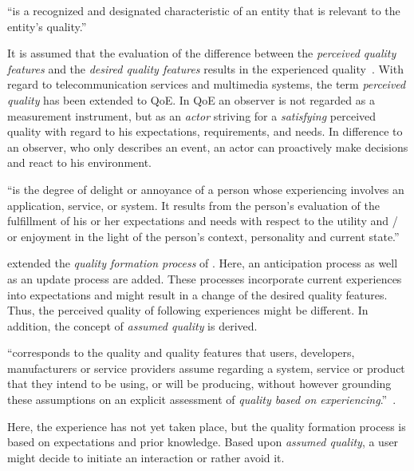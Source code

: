 \begin{definition}
``is a recognized and designated characteristic of an entity that is relevant to the entity's quality.''~\citep[][p.\,17]{jekosch_voice_2005}
\end{definition}

It is assumed that the evaluation of the difference between the \emph{perceived quality features} and the \emph{desired quality features} results in the experienced quality~\citep[p.\,23]{raake_quality_2014}.
With regard to telecommunication services and multimedia systems, the term \emph{perceived quality} has been extended to \acf{QoE}.
In \ac{QoE} an observer is not regarded as a measurement instrument, but as an \emph{actor} striving for a \emph{satisfying} perceived quality with regard to his expectations, requirements,  and needs.\label{actor} 
In difference to an observer, who only describes an event, an actor can proactively make decisions and react to his environment.  

\begin{definition}
``is the degree of delight or annoyance of a person whose experiencing involves an application, service, or system.
It results from the person’s evaluation of the fulfillment of his or her expectations and needs with respect to the utility and / or enjoyment in the light of the person’s context, personality and current state.''~\citep[][p.\,19]{raake_quality_2014}
\end{definition}

\citet{raake_quality_2014} extended the \emph{quality formation process} of \citet{jekosch_voice_2005}.
Here, an anticipation process as well as an update process are added.
These processes incorporate current experiences into expectations and might result in a change of the desired quality features.
Thus, the perceived quality of following experiences might be different.
In addition, the concept of \emph{assumed quality} is derived.
\begin{definition}\label{def:assumedquality}
``corresponds to the quality and quality features that users, developers, manufacturers or service providers assume regarding a system, service or product that they intend to be using, or will be producing, without however grounding these assumptions on an explicit assessment of \textit{quality based on experiencing}.''~\citep[][p.\,17]{raake_quality_2014}.
\end{definition}
Here, the experience has not yet taken place, but the quality formation process is based on expectations and prior knowledge.
Based upon \emph{assumed quality}, a user might decide to initiate an interaction or rather avoid it.

